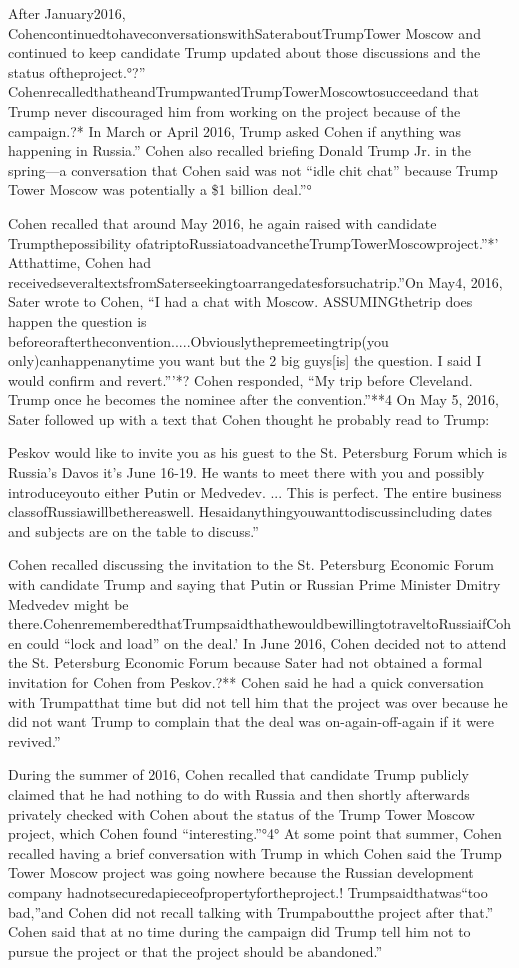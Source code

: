 After January2016, CohencontinuedtohaveconversationswithSateraboutTrumpTower Moscow and continued to keep candidate Trump updated about those discussions and the status oftheproject.°?” CohenrecalledthatheandTrumpwantedTrumpTowerMoscowtosucceedand that Trump never discouraged him from working on the project because of the campaign.?* In March or April 2016, Trump asked Cohen if anything was happening in Russia.” Cohen also recalled briefing Donald Trump Jr. in the spring—a conversation that Cohen said was not “idle chit chat” because Trump Tower Moscow was potentially a \$1 billion deal.”°

Cohen recalled that around May 2016, he again raised with candidate Trumpthepossibility ofatriptoRussiatoadvancetheTrumpTowerMoscowproject.”*' Atthattime, Cohen had receivedseveraltextsfromSaterseekingtoarrangedatesforsuchatrip.”On May4, 2016, Sater wrote to Cohen, “I had a chat with Moscow. ASSUMINGthetrip does happen the question is beforeoraftertheconvention.....Obviouslythepremeetingtrip(you only)canhappenanytime you want but the 2 big guys[is] the question. I said I would confirm and revert.”'*? Cohen responded, “My trip before Cleveland. Trump once he becomes the nominee after the convention.”**4 On May 5, 2016, Sater followed up with a text that Cohen thought he probably read to Trump:

Peskov would like to invite you as his guest to the St. Petersburg Forum which is Russia's Davos it's June 16-19. He wants to meet there with you and possibly introduceyouto either Putin or Medvedev. ... This is perfect. The entire business classofRussiawillbethereaswell. Hesaidanythingyouwanttodiscussincluding dates and subjects are on the table to discuss.”

Cohen recalled discussing the invitation to the St. Petersburg Economic Forum with candidate Trump and saying that Putin or Russian Prime Minister Dmitry Medvedev might be there.CohenrememberedthatTrumpsaidthathewouldbewillingtotraveltoRussiaifCohen could “lock and load” on the deal.' In June 2016, Cohen decided not to attend the St. Petersburg Economic Forum because Sater had not obtained a formal invitation for Cohen from Peskov.?** Cohen said he had a quick conversation with Trumpatthat time but did not tell him that the project was over because he did not want Trump to complain that the deal was on-again-off-again if it were revived.”

During the summer of 2016, Cohen recalled that candidate Trump publicly claimed that he had nothing to do with Russia and then shortly afterwards privately checked with Cohen about the status of the Trump Tower Moscow project, which Cohen found “interesting.”°4° At some point that summer, Cohen recalled having a brief conversation with Trump in which Cohen said the Trump Tower Moscow project was going nowhere because the Russian development company hadnotsecuredapieceofpropertyfortheproject.! Trumpsaidthatwas“too bad,”and Cohen did not recall talking with Trumpaboutthe project after that.” Cohen said that at no time during the campaign did Trump tell him not to pursue the project or that the project should be abandoned.”

